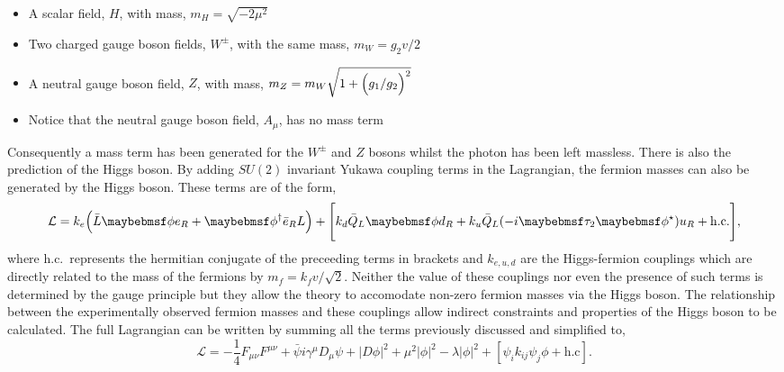\begin{itemize}
  \item A scalar field, $H$, with mass, $m_{H} = \sqrt{-2\mu^{2}}$
  \item Two charged gauge boson fields, $W^{\pm}$, with the same mass, $m_{W} = g_{2}v/2$
  \item A neutral gauge boson field, $Z$, with mass, $m_{Z} = m_{W}\sqrt{1+\Bigl(g_{1}/g_{2}\Bigr)^{2}}$
  \item Notice that the neutral gauge boson field, $A_{\mu}$, has no mass term
\end{itemize}

Consequently a mass term has been generated for the $W^{\pm}$ and $Z$ bosons whilst the photon has been left massless. There is also the prediction of the \SM Higgs boson. By adding $SU(2)$ invariant Yukawa coupling terms in the Lagrangian, the fermion masses can also be generated by the Higgs boson. These terms are of the form,
\begin{equation}
  \mathcal{L} = k_{e} \Bigl( \bar{L}\phi e_{R} + \phi^{\dagger}\bar{e}_{R} L \Bigr) + \Biggl[ k_{d}\bar{Q}_{L}\phi d_{R} + k_{u}\bar{Q}_{L}(-i\tau_{2}\phi^{\star})u_{R} + \mathrm{h.c.} \Bigg],
\end{equation}
where h.c.~represents the hermitian conjugate of the preceeding terms in brackets and $k_{e,u,d}$ are the Higgs-fermion couplings which are directly related to the mass of the fermions by $m_{f}=k_{f}v/\sqrt{2}$. Neither the value of these couplings nor even the presence of such terms is determined by the gauge principle but they allow the theory to accomodate non-zero fermion masses via the Higgs boson. The relationship between the experimentally observed fermion masses and these couplings allow indirect constraints and properties of the Higgs boson to be calculated. The full \SM Lagrangian can be written by summing all the terms previously discussed and simplified to,
\begin{equation}
  \mathcal{L} = -\frac{1}{4}F_{\mu\nu}F^{\mu\nu} + \bar{\psi}i\gamma^{\mu}D_{\mu}\psi + |D\phi|^{2} +\mu^{2}|\phi|^{2} -\lambda|\phi|^{2} + [ \psi_{i}k_{ij}\psi_{j}\phi + \mathrm{h.c} ].
\end{equation}


